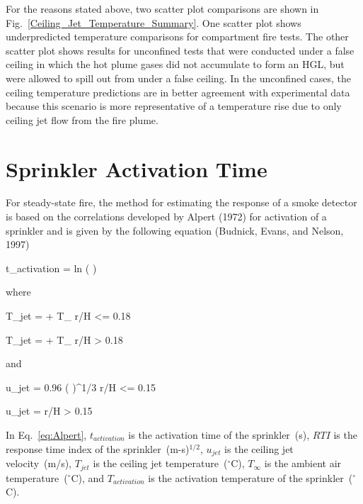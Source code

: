 For the reasons stated above, two scatter plot comparisons are shown in Fig.~\ref{Ceiling_Jet_Temperature_Summary}. One scatter plot shows underpredicted temperature comparisons for compartment fire tests. The other scatter plot shows results for unconfined tests that were conducted under a false ceiling in which the hot plume gases did not accumulate to form an HGL, but were allowed to spill out from under a false ceiling. In the unconfined cases, the ceiling temperature predictions are in better agreement with experimental data because this scenario is more representative of a temperature rise due to only ceiling jet flow from the fire plume.

\clearpage


\section{Sprinkler Activation Time}
\label{sec:sprinkler_alpert}

For steady-state fire, the method for estimating the response of a smoke detector is based on the correlations developed by Alpert (1972) for activation of a sprinkler and is given by the following equation (Budnick, Evans, and Nelson, 1997)

\be
t_{activation} =   ln \left(  \right)\label{eq:Alpert}
\ee

\noindent where

\be
T_{jet} =  + T_\infty {} r/H <= 0.18
\label{eq:Alpert_Tjet_lt}
\ee

\be
T_{jet} =  + T_\infty {} r/H > 0.18
\label{eq:Alpert_Tjet_gt}
\ee

\noindent and

\be
u_{jet} = 0.96 \left(  \right)^{1/3}  r/H <= 0.15
\label{eq:Alpert_ujet_lt}
\ee

\be
u_{jet} =   r/H > 0.15
\label{eq:Alpert_ujet_gt}
\ee

In Eq.~\ref{eq:Alpert}, $t_{activation}$ is the activation time of the sprinkler~(s), $RTI$ is the response time index of the sprinkler~(m-s)$^{1/2}$, $u_{jet}$ is the ceiling jet velocity~(m/s), $T_{jet}$ is the ceiling jet temperature~($^\circ$C), $T_\infty$ is the ambient air temperature~($^\circ$C), and $T_{activation}$ is the activation temperature of the sprinkler~($^\circ$C).

